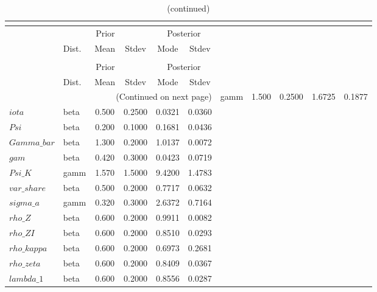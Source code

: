  
\begin{center}
\begin{longtable}{llcccc} 
\caption{Results from posterior maximization (parameters)}\\
 \label{Table:Posterior:1}\\
\toprule 
  & \multicolumn{3}{c}{Prior}  &  \multicolumn{2}{c}{Posterior} \\
  \cmidrule(r{.75em}){2-4} \cmidrule(r{.75em}){5-6}
  & Dist. & Mean  & Stdev & Mode & Stdev \\ 
\midrule \endfirsthead 
\caption{(continued)}\\
 \bottomrule 
  & \multicolumn{3}{c}{Prior}  &  \multicolumn{2}{c}{Posterior} \\
  \cmidrule(r{.75em}){2-4} \cmidrule(r{.75em}){5-6}
  & Dist. & Mean  & Stdev & Mode & Stdev \\ 
\midrule \endhead 
\bottomrule \multicolumn{6}{r}{(Continued on next page)}\endfoot 
\bottomrule\endlastfoot 
$sigma$ & gamm &   1.500 & 0.2500 &   1.6725 &  0.1877 \\ 
$iota$ & beta &   0.500 & 0.2500 &   0.0321 &  0.0360 \\ 
$Psi$ & beta &   0.200 & 0.1000 &   0.1681 &  0.0436 \\ 
$Gamma\_bar$ & beta &   1.300 & 0.2000 &   1.0137 &  0.0072 \\ 
$gam$ & beta &   0.420 & 0.3000 &   0.0423 &  0.0719 \\ 
$Psi\_K$ & gamm &   1.570 & 1.5000 &   9.4200 &  1.4783 \\ 
$var\_share$ & beta &   0.500 & 0.2000 &   0.7717 &  0.0632 \\ 
$sigma\_a$ & gamm &   0.320 & 0.3000 &   2.6372 &  0.7164 \\ 
$rho\_Z$ & beta &   0.600 & 0.2000 &   0.9911 &  0.0082 \\ 
$rho\_ZI$ & beta &   0.600 & 0.2000 &   0.8510 &  0.0293 \\ 
$rho\_kappa$ & beta &   0.600 & 0.2000 &   0.6973 &  0.2681 \\ 
$rho\_zeta$ & beta &   0.600 & 0.2000 &   0.8409 &  0.0367 \\ 
$lambda\_1$ & beta &   0.600 & 0.2000 &   0.8556 &  0.0287 \\ 
\end{longtable}
 \end{center}
